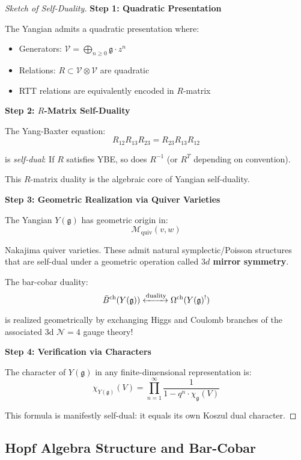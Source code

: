 \begin{proof}[Sketch of Self-Duality]
\textbf{Step 1: Quadratic Presentation}

The Yangian admits a quadratic presentation where:
\begin{itemize}
\item Generators: $\mathcal{V} = \bigoplus_{n \geq 0} \mathfrak{g} \cdot z^n$
\item Relations: $R \subset \mathcal{V} \otimes \mathcal{V}$ are quadratic
\item RTT relations are equivalently encoded in $R$-matrix
\end{itemize}

\textbf{Step 2: $R$-Matrix Self-Duality}

The Yang-Baxter equation:
$$R_{12} R_{13} R_{23} = R_{23} R_{13} R_{12}$$

is \emph{self-dual}: If $R$ satisfies YBE, so does $R^{-1}$ (or $R^T$ depending 
on convention).

This $R$-matrix duality is the algebraic core of Yangian self-duality.

\textbf{Step 3: Geometric Realization via Quiver Varieties}

The Yangian $Y(\mathfrak{g})$ has geometric origin in:
$$\mathcal{M}_{\text{quiv}}(v, w)$$

Nakajima quiver varieties. These admit natural symplectic/Poisson structures that 
are self-dual under a geometric operation called \textbf{$3d$ mirror symmetry}.

The bar-cobar duality:
$$\bar{B}^{\text{ch}}(Y(\mathfrak{g})) \xleftrightarrow{\text{duality}} 
\Omega^{\text{ch}}(Y(\mathfrak{g})^!)$$

is realized geometrically by exchanging Higgs and Coulomb branches of the 
associated 3d $\mathcal{N}=4$ gauge theory!

\textbf{Step 4: Verification via Characters}

The character of $Y(\mathfrak{g})$ in any finite-dimensional representation is:
$$\chi_{Y(\mathfrak{g})}(V) = \prod_{n=1}^\infty \frac{1}{1 - q^n \cdot \chi_{\mathfrak{g}}(V)}$$

This formula is manifestly self-dual: it equals its own Koszul dual character.
\end{proof}

\subsection{Hopf Algebra Structure and Bar-Cobar}

